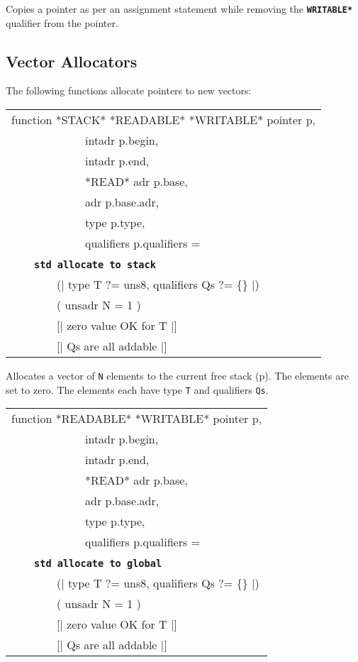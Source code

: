 \documentclass[12pt]{article}
\makeatletter
\newcommand{\TT}[1]{{\tt \bfseries #1}}
\newcommand{\ttstdkey}[1]{\TT{std #1}\index{#1@{\tt std #1}}}
\newcommand{\pagref}[1]{p\pageref{#1}}
\newenvironment{indpar}[1][0.3in]%
	{\begin{list}{}%
		     {\setlength{\itemsep}{0in}%
		      \setlength{\topsep}{0in}%
		      \setlength{\parsep}{1ex}%
		      \setlength{\labelwidth}{#1}%
		      \setlength{\leftmargin}{#1}%
		      \addtolength{\leftmargin}{\labelsep}}%
	 \item}%
	{\end{list}}
\makeatother
\begin{document}
\begin{indpar}
Copies a pointer as per an assignment statement while removing the
\TT{*WRITABLE*} qualifier from the pointer.
\end{indpar}

\subsection{Vector Allocators}
\label{VECTOR-ALLOCATORS}


The following functions allocate pointers to new vectors:

\begin{indpar}


{\tt\begin{tabular}{@{}l}
function *STACK* *READABLE* *WRITABLE* pointer p, \\
~~~~~~~~~~~~~intadr p.begin, \\
~~~~~~~~~~~~~intadr p.end, \\
~~~~~~~~~~~~~*READ* adr p.base, \\
~~~~~~~~~~~~~adr p.base.adr, \\
~~~~~~~~~~~~~type p.type, \\
~~~~~~~~~~~~~qualifiers p.qualifiers = \\
~~~~\ttstdkey{allocate to stack} \\
~~~~~~~~(| type T ?= uns8, qualifiers Qs ?= \{\} |) \\
~~~~~~~~( unsadr N = 1 ) \\
~~~~~~~~[| zero value OK for T |] \\
~~~~~~~~[| Qs are all addable |] \\
\end{tabular}}\label{POINTER-ALLOCATE-TO-STACK}

\begin{indpar}
Allocates a vector of {\tt N} elements to the current free
stack (\pagref{FREE-STACK}).  The elements are set to zero.
The elements each have type {\tt T} and qualifiers {\tt Qs}.
\end{indpar}

{\tt\begin{tabular}{@{}l}
function *READABLE* *WRITABLE* pointer p, \\
~~~~~~~~~~~~~intadr p.begin, \\
~~~~~~~~~~~~~intadr p.end, \\
~~~~~~~~~~~~~*READ* adr p.base, \\
~~~~~~~~~~~~~adr p.base.adr, \\
~~~~~~~~~~~~~type p.type, \\
~~~~~~~~~~~~~qualifiers p.qualifiers = \\
~~~~\ttstdkey{allocate to global} \\
~~~~~~~~(| type T ?= uns8, qualifiers Qs ?= \{\} |) \\
~~~~~~~~( unsadr N = 1 ) \\
~~~~~~~~[| zero value OK for T |] \\
~~~~~~~~[| Qs are all addable |] \\
\end{tabular}}\label{POINTER-ALLOCATE-TO-GLOBAL}


\end{indpar}
\end{document}
